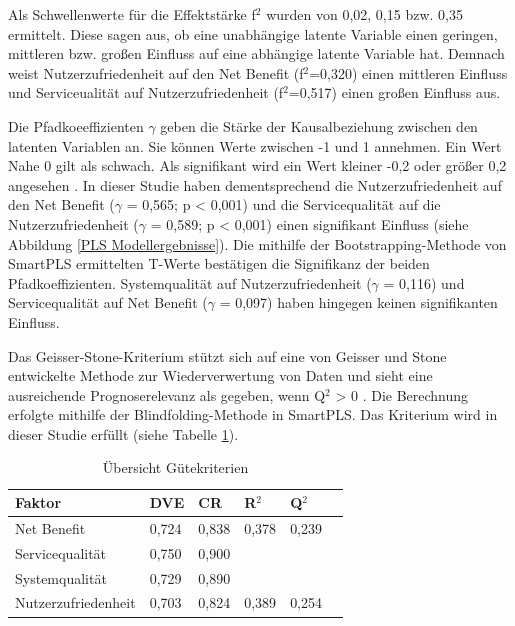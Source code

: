 Als Schwellenwerte für die Effektstärke f$^2$ wurden von \textcite[S.316f.]{chin1998partial} 0,02, 0,15 bzw. 0,35 ermittelt. Diese sagen aus, ob eine unabhängige latente Variable einen geringen, mittleren bzw. großen Einfluss auf eine abhängige latente Variable hat. Demnach weist Nutzerzufriedenheit auf den Net Benefit (f$^2$=0,320) einen mittleren Einfluss und Serviceualität auf Nutzerzufriedenheit (f$^2$=0,517) einen großen Einfluss aus. 

Die Pfadkoeeffizienten $\gamma$ geben die Stärke der Kausalbeziehung zwischen den latenten Variablen an. Sie können Werte zwischen -1 und 1 annehmen. Ein Wert Nahe 0 gilt als schwach. Als signifikant wird ein Wert kleiner -0,2 oder größer 0,2 angesehen \parencite[vgl.][S.11]{chin1998commentary}. In dieser Studie haben dementsprechend die Nutzerzufriedenheit auf den Net Benefit ($\gamma$ = 0,565; p < 0,001) und die Servicequalität auf die Nutzerzufriedenheit ($\gamma$ = 0,589; p < 0,001) einen signifikant Einfluss (siehe Abbildung \ref{PLS Modellergebnisse}). Die mithilfe der Bootstrapping-Methode von SmartPLS ermittelten T-Werte bestätigen die Signifikanz der beiden Pfadkoeffizienten. Systemqualität auf Nutzerzufriedenheit ($\gamma$ = 0,116) und Servicequalität auf Net Benefit ($\gamma$ = 0,097) haben hingegen keinen signifikanten Einfluss. 

\nocite{geisser1974predictive}

Das Geisser-Stone-Kriterium stützt sich auf eine von Geisser und Stone entwickelte Methode zur Wiederverwertung von Daten und sieht eine ausreichende Prognoserelevanz als gegeben, wenn Q$^2$ > 0 \parencite[vgl.][S.35]{nitzl2010anwenderorientierte}. Die Berechnung erfolgte mithilfe der Blindfolding-Methode in SmartPLS. Das Kriterium wird in dieser Studie erfüllt (siehe Tabelle \ref{tab:Übersicht Gütekriterien}).
 

\begin{table}[h] 
\footnotesize
\caption{Übersicht Gütekriterien}
\label{tab:Übersicht Gütekriterien} 
\begin{tabular}{@{}llllll@{}} \toprule

\textbf{Faktor} & \textbf{DVE} & \textbf{CR} & \textbf{R$^2$} & \textbf{Q$^2$} \\ \midrule

 Net Benefit 		& 0,724 		& 0,838 		& 0,378 		& 0,239 		 \\
 
 Servicequalität 	& 0,750 		& 0,900 		& 			& 			 \\

 Systemqualität 	& 0,729 		& 0,890 		& 			& 			 \\

 Nutzerzufriedenheit & 0,703 	& 0,824 		& 0,389 		& 0,254		 \\ \bottomrule
\end{tabular}	
\end{table}



